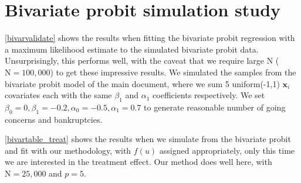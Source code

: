 \documentclass[aoas,preprint, 11pt, dvipsnames, table, x11name]{imsart}
\newcommand{\N}{\mbox{N}}
\renewcommand{\bm}[1]{\mathbf{#1}}
\theoremstyle{remark}
\begin{document}
	\section{Bivariate probit simulation study}\label{bivar_append}
	 \autoref{bivarvalidate} shows the results when fitting the bivariate probit regression with a maximum likelihood estimate to the simulated bivariate probit data.  Unsurprisingly, this performs well, with the caveat that we require large $\N$ ($\N=100,000$) to get these impressive results.  We simulated the samples from the bivariate probit model of the main document, where we sum 5 uniform(-1,1) $\bm{x}_i$ covariates each with the same $\beta_1$ and $\alpha_1$ coefficients respectively.  We set $\beta_0=0, \beta_1=-0.2, \alpha_0=-0.5, \alpha_1=0.7$ to generate reasonable number of going concerns and bankruptcies.
	
	 \autoref{bivartable_treat} shows the results when we simulate from the bivariate probit and fit with our methodology, with $f(u)$ assigned appropriately, only this time we are interested in the treatment effect.  Our method does well here, with $\N=25,000$ and $p=5$.  
	
\end{document}
